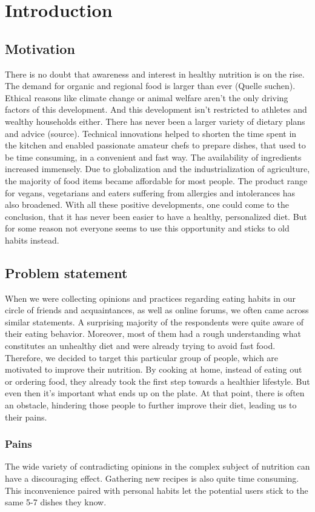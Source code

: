 \chapter{Introduction}
\section{Motivation}
There is no doubt that awareness and interest in healthy nutrition is on the rise. The demand for organic and regional food is larger than ever (Quelle suchen). Ethical reasons like climate change or animal welfare aren’t the only driving factors of this development. And this development isn’t restricted to athletes and wealthy households either. There has never been a larger variety of dietary plans and advice (source). Technical innovations helped to shorten the time spent in the kitchen and enabled passionate amateur chefs to prepare dishes, that used to be time consuming, in a convenient and fast way. The availability of ingredients increased immensely. Due to globalization and the industrialization of agriculture, the majority of food items became affordable for most people. The product range for vegans, vegetarians and eaters suffering from allergies and intolerances has also broadened. With all these positive developments, one could come to the conclusion, that it has never been easier to have a healthy, personalized diet. But for some reason not everyone seems to use this opportunity and sticks to old habits instead.
\section{Problem statement}
When we were collecting opinions and practices regarding eating habits in our circle of friends and acquaintances, as well as online forums, we often came across similar statements. A surprising majority of the respondents were quite aware of their eating behavior. Moreover, most of them had a rough understanding what constitutes an unhealthy diet and were already trying to avoid fast food. Therefore, we decided to target this particular group of people, which are motivated to improve their nutrition. By cooking at home, instead of eating out or ordering food, they already took the first step towards a healthier lifestyle.
But even then it’s important what ends up on the plate. At that point, there is often an obstacle, hindering those people to further improve their diet, leading us to their  pains.

\subsection{Pains}
The wide variety of contradicting opinions in the complex subject of nutrition can have a discouraging effect. Gathering new recipes is also quite time consuming. This inconvenience paired with personal habits let the potential users stick to the same 5-7 dishes they know.

